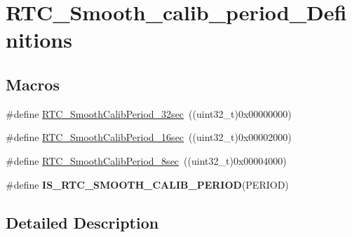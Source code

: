 \hypertarget{group___r_t_c___smooth__calib__period___definitions}{\section{R\-T\-C\-\_\-\-Smooth\-\_\-calib\-\_\-period\-\_\-\-Definitions}
\label{group___r_t_c___smooth__calib__period___definitions}
}
\subsection*{Macros}
\begin{DoxyCompactItemize}
\item 
\#define \hyperlink{group___r_t_c___smooth__calib__period___definitions_ga1410c28a3644ce52dfbdf2f21a037eef}{R\-T\-C\-\_\-\-Smooth\-Calib\-Period\-\_\-32sec}~((uint32\-\_\-t)0x00000000)
\item 
\#define \hyperlink{group___r_t_c___smooth__calib__period___definitions_ga31b86cd48a0ef55f1837ab5175c52eb9}{R\-T\-C\-\_\-\-Smooth\-Calib\-Period\-\_\-16sec}~((uint32\-\_\-t)0x00002000)
\item 
\#define \hyperlink{group___r_t_c___smooth__calib__period___definitions_ga8a34f8b7e145649bad2ec36b69eccbd3}{R\-T\-C\-\_\-\-Smooth\-Calib\-Period\-\_\-8sec}~((uint32\-\_\-t)0x00004000)
\item 
\#define {\bfseries I\-S\-\_\-\-R\-T\-C\-\_\-\-S\-M\-O\-O\-T\-H\-\_\-\-C\-A\-L\-I\-B\-\_\-\-P\-E\-R\-I\-O\-D}(P\-E\-R\-I\-O\-D)
\end{DoxyCompactItemize}


\subsection{Detailed Description}


